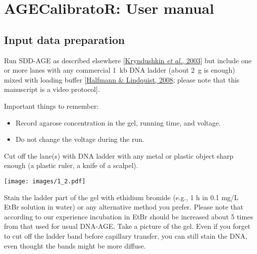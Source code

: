 \documentclass[11pt]{article}
\begin{document}
\section*{AGECalibratoR: User manual}

\subsection*{Input data preparation}



\begin{enumerate}


\begin{minipage}{0.57\linewidth}
	\item Run SDD-AGE as described elsewhere [\hyperlink{http://www.jbc.org/content/278/49/49636.full}{Kryndushkin \textit{et al.}, 2003}] but include one or more lanes with any commercial 1~kb DNA ladder (about 2~\textmu{}g is enough) mixed with loading buffer [\hyperlink{dx.doi.org/10.3791/838}{Halfmann \& Lindquist, 2008}; please note that this manuscript is a video protocol].
	
	Important things to remember: 
	\begin{itemize}
		\item Record agarose concentration in the gel, running time, and voltage.
		\item Do not change the voltage during the run.
	\end{itemize}

	\item Cut off the lane(s) with DNA ladder with any metal or plastic object sharp enough (a plastic ruler, a knife of a scalpel).
	
\end{minipage}
\begin{minipage}{0.4\linewidth}
	\hskip 10mm
	\texttt{[image: images/1\_2.pdf]}
\end{minipage}  \hskip 3mm




\item Stain the ladder part of the gel with ethidium bromide (e.g., 1 h in 0.1 mg/L EtBr solution in water) or any alternative method you prefer. Please note that according to our experience incubation in EtBr should be increased about 5 times from that used for usual DNA-AGE. Take a picture of the gel. Even if you forget to cut off the ladder band before capillary transfer, you can still stain the DNA, even thought the bands might be more diffuse. 


\end{enumerate}
\end{document}
